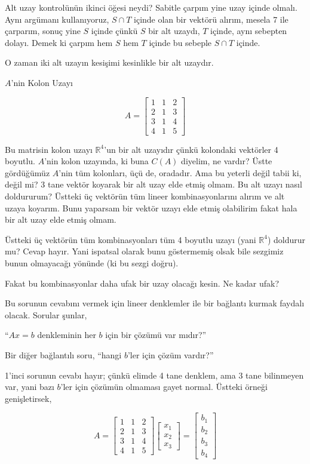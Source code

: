 \documentclass[12pt,fleqn]{article}\usepackage{../../common}
\begin{document}
Alt uzay kontrolünün ikinci öğesi neydi? Sabitle çarpım yine uzay içinde
olmalı. Aynı argümanı kullanıyoruz, $S \cap T$ içinde olan bir vektörü
alırım, mesela 7 ile çarparım, sonuç yine $S$ içinde çünkü $S$ bir alt
uzaydı, $T$ içinde, aynı sebepten dolayı. Demek ki çarpım hem $S$ hem $T$
içinde bu sebeple $S \cap T$ içinde.

O zaman iki alt uzayın kesişimi kesinlikle bir alt uzaydır. 

$A$'nin Kolon Uzayı

$$ A = 
\left[\begin{array}{rrr}
1 & 1 & 2 \\
2 & 1 & 3 \\
3 & 1 & 4 \\
4 & 1 & 5 
\end{array}\right]
$$

Bu matrisin kolon uzayı $\mathbb{R}^4$'un bir alt uzayıdır çünkü kolondaki
vektörler 4 boyutlu. $A$'nin kolon uzayında, ki buna $C(A)$ diyelim, ne
vardır? Üstte gördüğümüz $A$'nin tüm kolonları, üçü de, oradadır. Ama bu
yeterli değil tabii ki, değil mi? 3 tane vektör koyarak bir alt uzay elde
etmiş olmam. Bu alt uzayı nasıl doldururum? Üstteki üç vektörün tüm lineer
kombinasyonlarını alırım ve alt uzaya koyarım. Bunu yaparsam bir vektör
uzayı elde etmiş olabilirim fakat hala bir alt uzay elde etmiş olmam. 

Üstteki üç vektörün tüm kombinasyonları tüm 4 boyutlu uzayı (yani
$\mathbb{R}^4$) doldurur mu? Cevap hayır. Yani ispatsal olarak bunu
göstermemiş olsak bile sezgimiz bunun olmayacağı yönünde (ki bu sezgi
doğru). 

Fakat bu kombinasyonlar daha ufak bir uzay olacağı kesin. Ne kadar ufak? 

Bu sorunun cevabını vermek için lineer denklemler ile bir bağlantı kurmak
faydalı olacak. Sorular şunlar,

``$Ax = b$ denkleminin her $b$ için bir çözümü var mıdır?''

Bir diğer bağlantılı soru, ``hangi $b$'ler için çözüm vardır?''

1'inci sorunun cevabı hayır; çünkü elimde 4 tane denklem, ama 3 tane
bilinmeyen var, yani bazı $b$'ler için çözümün olmaması gayet
normal. Üstteki örneği genişletirsek,

$$ A = 
\left[\begin{array}{rrr}
1 & 1 & 2 \\
2 & 1 & 3 \\
3 & 1 & 4 \\
4 & 1 & 5 
\end{array}\right]
\left[\begin{array}{r}
x_1  \\
x_2  \\
x_3  
\end{array}\right] 
=
\left[\begin{array}{r}
b_1  \\
b_2  \\
b_3  \\
b_4  
\end{array}\right]
 $$
\end{document}
